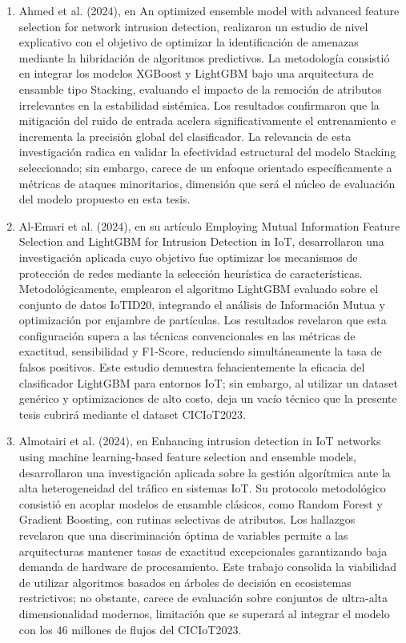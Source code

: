 \begin{enumerate}
\item Ahmed et al. (2024), en An optimized ensemble model with advanced feature selection for network intrusion detection, realizaron un estudio de nivel explicativo con el objetivo de optimizar la identificación de amenazas mediante la hibridación de algoritmos predictivos. La metodología consistió en integrar los modelos XGBoost y LightGBM bajo una arquitectura de ensamble tipo Stacking, evaluando el impacto de la remoción de atributos irrelevantes en la estabilidad sistémica. Los resultados confirmaron que la mitigación del ruido de entrada acelera significativamente el entrenamiento e incrementa la precisión global del clasificador. La relevancia de esta investigación radica en validar la efectividad estructural del modelo Stacking seleccionado; sin embargo, carece de un enfoque orientado específicamente a métricas de ataques minoritarios, dimensión que será el núcleo de evaluación del modelo propuesto en esta tesis.

\item Al-Emari et al. (2024), en su artículo Employing Mutual Information Feature Selection and LightGBM for Intrusion Detection in IoT, desarrollaron una investigación aplicada cuyo objetivo fue optimizar los mecanismos de protección de redes mediante la selección heurística de características. Metodológicamente, emplearon el algoritmo LightGBM evaluado sobre el conjunto de datos IoTID20, integrando el análisis de Información Mutua y optimización por enjambre de partículas. Los resultados revelaron que esta configuración supera a las técnicas convencionales en las métricas de exactitud, sensibilidad y F1-Score, reduciendo simultáneamente la tasa de falsos positivos. Este estudio demuestra fehacientemente la eficacia del clasificador LightGBM para entornos IoT; sin embargo, al utilizar un dataset genérico y optimizaciones de alto costo, deja un vacío técnico que la presente tesis cubrirá mediante el dataset CICIoT2023.

\item Almotairi et al. (2024), en Enhancing intrusion detection in IoT networks using machine learning-based feature selection and ensemble models, desarrollaron una investigación aplicada sobre la gestión algorítmica ante la alta heterogeneidad del tráfico en sistemas IoT. Su protocolo metodológico consistió en acoplar modelos de ensamble clásicos, como Random Forest y Gradient Boosting, con rutinas selectivas de atributos. Los hallazgos revelaron que una discriminación óptima de variables permite a las arquitecturas mantener tasas de exactitud excepcionales garantizando baja demanda de hardware de procesamiento. Este trabajo consolida la viabilidad de utilizar algoritmos basados en árboles de decisión en ecosistemas restrictivos; no obstante, carece de evaluación sobre conjuntos de ultra-alta dimensionalidad modernos, limitación que se superará al integrar el modelo con los 46 millones de flujos del CICIoT2023.


\end{enumerate}
